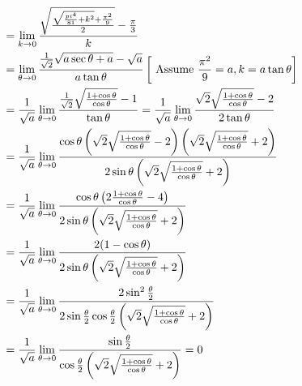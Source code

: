 \documentclass[a4paper, 11pt]{article}
\begin{document}
{\begin{enumerate}[label=(\alph*)]
\begin{align*}
			                                                               & = \lim_{k\to 0 } \frac{ \sqrt{ \frac{ \sqrt{ \frac{pi^4}{81}+k^2 } +\frac{\pi^2}{9} }{2} }-\frac{\pi}{3} }{k}                                                                                                                                   \\
			                                                               & = \lim_{\theta\to 0 } \frac{ \frac1{\sqrt{2}} \sqrt{a\sec\theta +a}-\sqrt{a} }{a\tan\theta}\lt[\text{ Assume }\frac{\pi^2}{9}=a, k=a\tan\theta \rt]                                                                                             \\
			                                                               & = \frac1{\sqrt{a}}\lim_{\theta\to 0 } \frac{ \frac1{\sqrt{2}}\sqrt{\frac{1+\cos\theta}{\cos\theta}}-1 }{\tan\theta}=\frac1{\sqrt{a}}\lim_{\theta\to 0 } \frac{\sqrt{2}\sqrt{\frac{1+\cos\theta}{\cos\theta}}-2 }{2\tan\theta}                   \\
			                                                               & = \frac1{\sqrt{a}}\lim_{\theta\to 0 } \frac{\cos\theta\lt(\sqrt{2}\sqrt{\frac{1+\cos\theta}{\cos\theta}}-2\rt)\lt(\sqrt{2}\sqrt{\frac{1+\cos\theta}{\cos\theta}}+2 \rt) }{2\sin\theta\lt(\sqrt{2}\sqrt{\frac{1+\cos\theta}{\cos\theta}}+2 \rt)} \\
			                                                               & = \frac1{\sqrt{a}}\lim_{\theta\to 0 } \frac{ \cos\theta \lt( 2\frac{1+\cos\theta}{\cos\theta}-4 \rt)}{2\sin\theta\lt(\sqrt{2}\sqrt{\frac{1+\cos\theta}{\cos\theta}}+2 \rt)}                                                                     \\
			                                                               & = \frac1{\sqrt{a}}\lim_{\theta\to 0 } \frac{2(1-\cos\theta)}{2\sin\theta\lt(\sqrt{2}\sqrt{\frac{1+\cos\theta}{\cos\theta}}+2 \rt)}                                                                                                              \\
			                                                               & = \frac1{\sqrt{a}}\lim_{\theta\to0} \frac{2\sin^2\frac{\theta}{2}}{2\sin\frac{\theta}{2}\cos\frac{\theta}{2}\lt(\sqrt{2}\sqrt{\frac{1+\cos\theta}{\cos\theta}}+2 \rt)}                                                                          \\
			                                                               & = \frac1{\sqrt{a}}\lim_{\theta\to0} \frac{\sin\frac{\theta}{2}}{\cos\frac{\theta}{2}\lt(\sqrt{2}\sqrt{\frac{1+\cos\theta}{\cos\theta}}+2 \rt)}=0

\end{align*}
\end{enumerate}}
\end{document}
